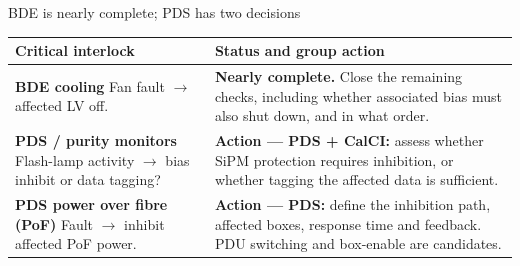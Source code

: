\begin{frame}{BDE is nearly complete; PDS has two decisions}
\renewcommand{\arraystretch}{1.3}
\begin{tabularx}{\textwidth}{@{}>{\RaggedRight\arraybackslash}p{4.4cm}>{\RaggedRight\arraybackslash}X@{}}
\toprule
\textbf{Critical interlock} & \textbf{Status and group action}\\\midrule
\textbf{BDE cooling}\newline
Fan fault $\rightarrow$ affected LV off.
& \textbf{Nearly complete.} Close the remaining checks, including whether associated bias must also shut down, and in what order.\\[1.2ex]
\textbf{PDS / purity monitors}\newline
Flash-lamp activity $\rightarrow$ bias inhibit or data tagging?
& \textbf{\color{DuneDanger}Action --- PDS + CalCI:} assess whether SiPM protection requires inhibition, or whether tagging the affected data is sufficient.\\[1.2ex]
\textbf{PDS power over fibre (PoF)}\newline
Fault $\rightarrow$ inhibit affected PoF power.
& \textbf{\color{DuneDanger}Action --- PDS:} define the inhibition path, affected boxes, response time and feedback. PDU switching and box-enable are candidates.\\
\bottomrule
\end{tabularx}\par\medskip
{}
\end{frame}

